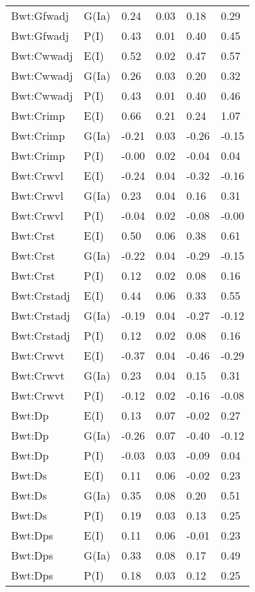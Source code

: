 \begin{center}
\begin{longtable}{|p{1.1in}|p{0.7in}|p{0.7in}|p{0.6in}|p{0.6in}|p{0.6in}|}
  Bwt:Gfwadj & G(Ia) & 0.24 & 0.03 & 0.18 & 0.29 \\ 
  Bwt:Gfwadj & P(I) & 0.43 & 0.01 & 0.40 & 0.45 \\ 
  Bwt:Cwwadj & E(I) & 0.52 & 0.02 & 0.47 & 0.57 \\ 
  Bwt:Cwwadj & G(Ia) & 0.26 & 0.03 & 0.20 & 0.32 \\ 
  Bwt:Cwwadj & P(I) & 0.43 & 0.01 & 0.40 & 0.46 \\ 
  Bwt:Crimp & E(I) & 0.66 & 0.21 & 0.24 & 1.07 \\ 
  Bwt:Crimp & G(Ia) & -0.21 & 0.03 & -0.26 & -0.15 \\ 
  Bwt:Crimp & P(I) & -0.00 & 0.02 & -0.04 & 0.04 \\ 
  Bwt:Crwvl & E(I) & -0.24 & 0.04 & -0.32 & -0.16 \\ 
  Bwt:Crwvl & G(Ia) & 0.23 & 0.04 & 0.16 & 0.31 \\ 
  Bwt:Crwvl & P(I) & -0.04 & 0.02 & -0.08 & -0.00 \\ 
  Bwt:Crst & E(I) & 0.50 & 0.06 & 0.38 & 0.61 \\ 
  Bwt:Crst & G(Ia) & -0.22 & 0.04 & -0.29 & -0.15 \\ 
  Bwt:Crst & P(I) & 0.12 & 0.02 & 0.08 & 0.16 \\ 
  Bwt:Crstadj & E(I) & 0.44 & 0.06 & 0.33 & 0.55 \\ 
  Bwt:Crstadj & G(Ia) & -0.19 & 0.04 & -0.27 & -0.12 \\ 
  Bwt:Crstadj & P(I) & 0.12 & 0.02 & 0.08 & 0.16 \\ 
  Bwt:Crwvt & E(I) & -0.37 & 0.04 & -0.46 & -0.29 \\ 
  Bwt:Crwvt & G(Ia) & 0.23 & 0.04 & 0.15 & 0.31 \\ 
  Bwt:Crwvt & P(I) & -0.12 & 0.02 & -0.16 & -0.08 \\ 
  Bwt:Dp & E(I) & 0.13 & 0.07 & -0.02 & 0.27 \\ 
  Bwt:Dp & G(Ia) & -0.26 & 0.07 & -0.40 & -0.12 \\ 
  Bwt:Dp & P(I) & -0.03 & 0.03 & -0.09 & 0.04 \\ 
  Bwt:Ds & E(I) & 0.11 & 0.06 & -0.02 & 0.23 \\ 
  Bwt:Ds & G(Ia) & 0.35 & 0.08 & 0.20 & 0.51 \\ 
  Bwt:Ds & P(I) & 0.19 & 0.03 & 0.13 & 0.25 \\ 
  Bwt:Dps & E(I) & 0.11 & 0.06 & -0.01 & 0.23 \\ 
  Bwt:Dps & G(Ia) & 0.33 & 0.08 & 0.17 & 0.49 \\ 
  Bwt:Dps & P(I) & 0.18 & 0.03 & 0.12 & 0.25 \\ 

\end{longtable}
\end{center}
